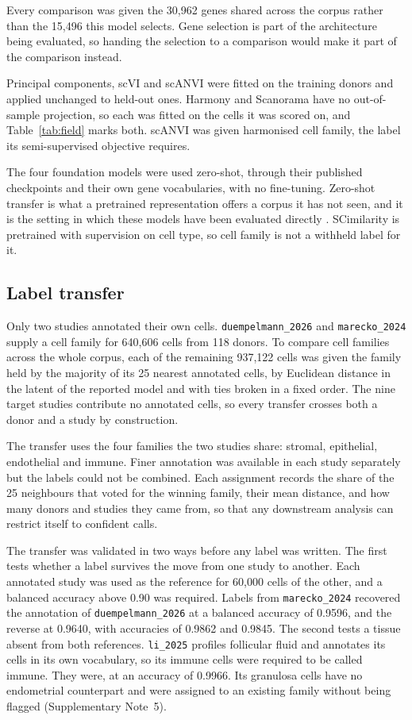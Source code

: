 Every comparison was given the 30{,}962 genes shared across the corpus rather
than the 15{,}496 this model selects. Gene selection is part of the
architecture being evaluated, so handing the selection to a comparison would
make it part of the comparison instead.

Principal components, scVI and scANVI were fitted on the training donors and
applied unchanged to held-out ones. Harmony and Scanorama have no
out-of-sample projection, so each was fitted on the cells it was scored on,
and Table~\ref{tab:field} marks both. scANVI was given harmonised cell family,
the label its semi-supervised objective requires.

The four foundation models were used zero-shot, through their published
checkpoints and their own gene vocabularies, with no fine-tuning. Zero-shot
transfer is what a pretrained representation offers a corpus it has not seen,
and it is the setting in which these models have been evaluated directly
\citep{kedzierska2025zeroshot}. SCimilarity is pretrained with supervision on
cell type, so cell family is not a withheld label for it.

\subsection*{Label transfer}

Only two studies annotated their own cells. \texttt{duempelmann\_2026} and
\texttt{marecko\_2024} supply a cell family for 640{,}606 cells from 118
donors. To compare cell families
across the whole corpus, each of the remaining 937{,}122 cells was given the
family held by the majority of its 25 nearest annotated cells, by Euclidean
distance in the latent of the reported model and with ties broken in a 
fixed order. The nine target studies contribute no annotated cells, so every transfer
crosses both a donor and a study by construction.

The transfer uses the four families the two studies share: stromal,
epithelial, endothelial and immune. Finer annotation was available in 
each study separately but the labels could not be combined. Each assignment
records the share of the 25 neighbours that voted for the winning
family, their mean distance, and how many donors and studies they came from,
so that any downstream analysis can restrict itself to confident calls.

The transfer was validated in two ways before any label was written. The
first tests whether a label survives the move from one study to another.
Each annotated study was used as the reference for 60{,}000 cells of the
other, and a balanced accuracy above 0.90 was required. Labels from
\texttt{marecko\_2024} recovered the annotation of \texttt{duempelmann\_2026}
at a balanced accuracy of 0.9596, and the reverse at 0.9640, with accuracies
of 0.9862 and 0.9845. The second tests a tissue absent from both references.
\texttt{li\_2025} profiles follicular fluid and annotates its cells in its
own vocabulary, so its immune cells were required to be called immune. They
were, at an accuracy of 0.9966. Its granulosa cells have no endometrial
counterpart and were assigned to an existing family without being flagged
(Supplementary Note~5).


